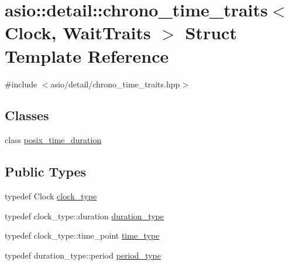 \hypertarget{structasio_1_1detail_1_1chrono__time__traits}{}\section{asio\+:\+:detail\+:\+:chrono\+\_\+time\+\_\+traits$<$ Clock, Wait\+Traits $>$ Struct Template Reference}
\label{structasio_1_1detail_1_1chrono__time__traits}


{\ttfamily \#include $<$asio/detail/chrono\+\_\+time\+\_\+traits.\+hpp$>$}

\subsection*{Classes}
\begin{DoxyCompactItemize}
\item 
class \hyperlink{classasio_1_1detail_1_1chrono__time__traits_1_1posix__time__duration}{posix\+\_\+time\+\_\+duration}
\end{DoxyCompactItemize}
\subsection*{Public Types}
\begin{DoxyCompactItemize}
\item 
typedef Clock \hyperlink{structasio_1_1detail_1_1chrono__time__traits_a0043b268ffdb59f6b880a96512ab5453}{clock\+\_\+type}
\item 
typedef clock\+\_\+type\+::duration \hyperlink{structasio_1_1detail_1_1chrono__time__traits_a7f122a7cb603e7516bb6595016960775}{duration\+\_\+type}
\item 
typedef clock\+\_\+type\+::time\+\_\+point \hyperlink{structasio_1_1detail_1_1chrono__time__traits_a19c14f4d45a8b164d2ea4590eebc1c10}{time\+\_\+type}
\item 
typedef duration\+\_\+type\+::period \hyperlink{structasio_1_1detail_1_1chrono__time__traits_aebb85fcb3beb946b4ea037a411b6d931}{period\+\_\+type}
\end{DoxyCompactItemize}
